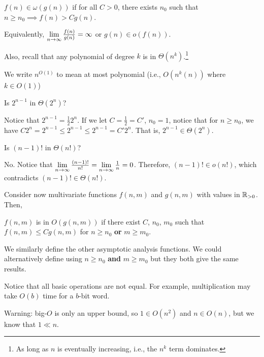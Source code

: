 \begin{defn}
  $f(n) \in \omega(g(n))$ if for all $C > 0$, there exists $n_0$
  such that $n \geq n_0 \implies f(n) > Cg(n)$.

  Equivalently, $\lim\limits_{n\to\infty}\frac{f(n)}{g(n)} = \infty$ or $g(n) \in o(f(n))$.
\end{defn}

Also, recall that any polynomial of degree $k$ is in $\Theta(n^k)$.\footnote{As long as $n$ is eventually increasing, i.e., the $n^k$ term dominates.}

We write $n^{O(1)}$ to mean at most polynomial (i.e., $O(n^k(n))$ where $k \in O(1)$)

\begin{xca}
  Is $2^{n-1}$ in $\Theta(2^n)$?
\end{xca}
\begin{prf}
  Notice that $2^{n-1} = \frac12 2^n$.
  If we let $C = \frac12 = C'$, $n_0 = 1$, notice that for $n \geq n_0$,
  we have $C 2^n = 2^{n-1} \leq 2^{n-1} \leq 2^{n-1} = C'2^n$.
  That is, $2^{n-1} \in \Theta(2^n)$.
\end{prf}

\begin{xca}
  Is $(n-1)!$ in $\Theta(n!)$?
\end{xca}
\begin{sol}
  No. Notice that $\lim\limits_{n\to\infty} \frac{(n-1)!}{n!} = \lim\limits_{n\to\infty} \frac1n = 0$.
  Therefore, $(n-1)! \in o(n!)$, which contradicts $(n-1)! \in \Theta(n!)$.
\end{sol}

Consider now multivariate functions $f(n,m)$ and $g(n,m)$
with values in $\mathbb{R}_{>0}$. Then,

\begin{defn*}
  $f(n,m)$ is in $O(g(n,m))$ if there exist $C$, $n_0$, $m_0$
  such that $f(n,m) \leq C g(n,m)$ for $n \geq n_0$ \textbf{or} $m \geq m_0$.
\end{defn*}

We similarly define the other asymptotic analysis functions.
We could alternatively define using $n \geq n_0$ \textbf{and} $m \geq m_0$
but they both give the same results.


Notice that all basic operations are not equal.
For example, multiplication may take $O(b)$ time for a $b$-bit word.

Warning: big-$O$ is only an upper bound, so $1 \in O(n^2)$ and $n \in O(n)$, but we know that $1 \ll n$.

